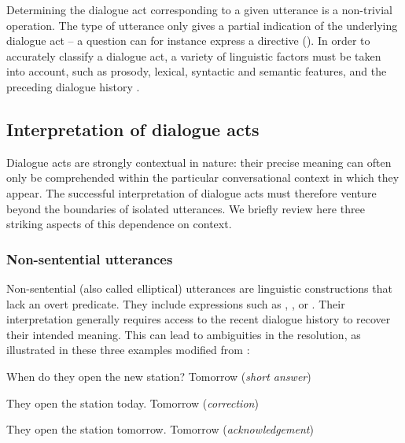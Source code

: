 Determining the dialogue act corresponding to a given utterance is a non-trivial operation. The type of utterance only gives a partial indication of the underlying dialogue act -- a question can for instance express a directive ().  In order to accurately classify a dialogue act, a variety of linguistic factors must be taken into account, such as prosody, lexical, syntactic and semantic features, and the preceding dialogue history \citep{jurafsky1998,Shriberg1998,stolcke2000,Keizer2007}.

\subsection{Interpretation of dialogue acts} 

Dialogue acts are strongly contextual in nature: their precise meaning can often only be comprehended within the particular conversational context in which they appear. The successful interpretation  of dialogue acts must therefore venture beyond the boundaries of isolated utterances. We briefly review here three striking aspects of this dependence on context.

\subsubsection*{Non-sentential utterances}
\label{non-sentential utterance}
Non-sentential (also called elliptical) utterances are linguistic constructions that lack an overt predicate.  They include expressions such as  , , or . Their interpretation generally requires access to the recent dialogue history to recover their intended meaning. This can lead to ambiguities in the resolution, as illustrated in these three examples modified from \cite{Fernandez:2007}:

\begin{center}
\begin{dialogue}
 When do they open the new station?
 Tomorrow (\textit{short answer})
\end{dialogue}

\begin{dialogue}
 They open the station today.
 Tomorrow (\textit{correction})
\end{dialogue}

\begin{dialogue}
 They open the station tomorrow.
 Tomorrow (\textit{acknowledgement})
\end{dialogue}
\end{center}

